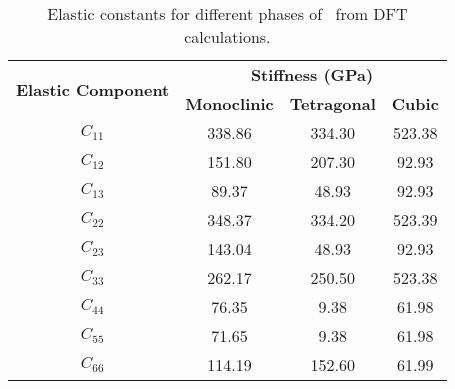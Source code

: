 \begin{table}[ht] %
\onehalfspacing
\centering
\caption{Elastic constants for different phases of \zirconia\ from DFT calculations.}
\label{stiffness_tensor}
\begin{tabular}{cccc}
\hline
\multirow{2}{*}{\textbf{Elastic Component}} & \multicolumn{3}{c}{\textbf{Stiffness (GPa)}}               \\ \cline{2-4} 
                                            & \textbf{Monoclinic} & \textbf{Tetragonal} & \textbf{Cubic} \\ \hline
$C_{11}$                                         & 338.86        & 334.30               & 523.38    \\
$C_{12}$                                         & 151.80        & 207.30               & 92.93     \\
$C_{13}$                                         & 89.37         & 48.93               & 92.93     \\
$C_{22}$                                         & 348.37        & 334.20               & 523.39    \\
$C_{23}$                                         & 143.04        & 48.93               & 92.93    \\
$C_{33}$                                         & 262.17        & 250.50               & 523.38   \\
$C_{44}$                                         & 76.35         & 9.38                & 61.98    \\
$C_{55}$                                         & 71.65         & 9.38                & 61.98   \\
$C_{66}$                                         & 114.19        & 152.60               & 61.99     \\ \hline
\end{tabular}
\end{table}

